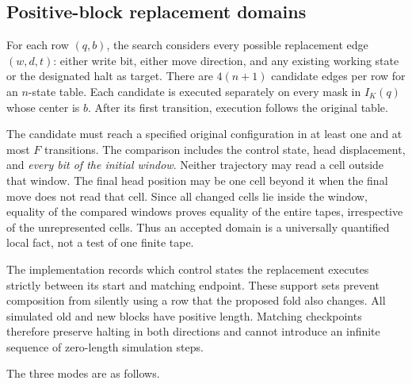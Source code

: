 \subsection{Positive-block replacement domains}

For each row $(q,b)$, the search considers every possible replacement
edge $(w,d,t)$: either write bit, either move direction, and any existing
working state or the designated halt as target.  There are
$4(n+1)$ candidate edges per row for an $n$-state table.  Each candidate
is executed separately on every mask in $I_K(q)$ whose center is $b$.
After its first transition, execution follows the original table.

The candidate must reach a specified original configuration in at
least one and at most $F$ transitions.  The comparison includes the
control state, head displacement, and \emph{every bit of the initial
window}.  Neither trajectory may read a cell outside that window.
The final head position may be one cell beyond it when the final move
does not read that cell.  Since all changed cells lie inside the
window, equality of the compared windows proves equality of the entire
tapes, irrespective of the unrepresented cells.  Thus an accepted
domain is a universally quantified local fact, not a test of one
finite tape.

The implementation records which control states the replacement
executes strictly between its start and matching endpoint.  These
support sets prevent composition from silently using a row that the
proposed fold also changes.  All simulated old and new blocks have
positive length.  Matching checkpoints therefore preserve halting in
both directions and cannot introduce an infinite sequence of
zero-length simulation steps.

The three modes are as follows.

